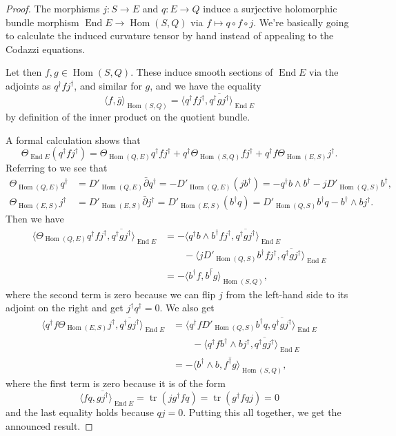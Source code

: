 \documentclass[10pt,a4paper]{article}
\newtheorem*{proof}{Proof}
\def\ov#1{\overline{#1}}
\DeclareMathOperator{\End}{End}
\DeclareMathOperator{\Hom}{Hom}
\DeclareMathOperator{\tr}{tr}
\begin{document}
\begin{proof}
The morphisms $j : S \to E$ and $q : E \to Q$ induce a surjective holomorphic bundle morphism $\End E \to \Hom(S,Q)$ via $f \mapsto q \circ f \circ j$. We're basically going to calculate the induced curvature tensor by hand instead of appealing to the Codazzi equations.

Let then $f,g \in \Hom(S,Q)$. These induce smooth sections of $\End E$ via the adjoints as $q^\dagger f j^\dagger$, and similar for $g$, and we have the equality
\[
\langle f, \ov g \rangle_{\Hom(S,Q)}
= \langle q^\dagger f j^\dagger, \ov{q^\dagger g j^\dagger} \rangle_{\End E}
\]
by definition of the inner product on the quotient bundle.

A formal calculation shows that
\[
\Theta_{\End E} (q^\dagger f j^\dagger)
= \Theta_{\Hom(Q,E)} q^\dagger f j^\dagger
+ q^\dagger \Theta_{\Hom(S,Q)} f j^\dagger
+ q^\dagger f \Theta_{\Hom(E,S)} j^\dagger.
\]
Referring to  we see that
\begin{align*}
\Theta_{\Hom(Q,E)} q^\dagger
&= D'_{\Hom(Q,E)} \bar\partial q^\dagger
= -D'_{\Hom(Q,E)} (j b^\dagger)
= -q^\dagger b \wedge b^\dagger - j D'_{\Hom(Q,S)}b^\dagger,
\\
\Theta_{\Hom(E,S)} j^\dagger
&= D'_{\Hom(E,S)} \bar\partial j^\dagger
= D'_{\Hom(E,S)}(b^\dagger q)
= D'_{\Hom(Q,S)}b^\dagger q - b^\dagger \wedge b j^\dagger.
\end{align*}
Then we have
\begin{align*}
\langle \Theta_{\Hom(Q,E)} q^\dagger f j^\dagger, \ov{q^\dagger g j^\dagger} \rangle_{\End E}
&= -\langle q^\dagger b \wedge b^\dagger f j^\dagger, \ov{q^\dagger g j^\dagger} \rangle_{\End E}
\\
&\qquad - \langle j D'_{\Hom(Q,S)}b^\dagger f j^\dagger, \ov{q^\dagger g j^\dagger} \rangle_{\End E}
\\
&= -\langle b^\dagger f, \ov{b^\dagger g} \rangle_{\Hom(S,Q)},
\end{align*}
where the second term is zero because we can flip $j$ from the left-hand side to its adjoint on the right and get $j^\dagger q^\dagger = 0$. We also get
\begin{align*}
\langle q^\dagger f \Theta_{\Hom(E,S)} j^\dagger, \ov{q^\dagger g j^\dagger} \rangle_{\End E}
&= \langle q^\dagger f D'_{\Hom(Q,S)}b^\dagger q , \ov{q^\dagger g j^\dagger} \rangle_{\End E}
\\
&\qquad
- \langle q^\dagger f b^\dagger \wedge b j^\dagger, \ov{q^\dagger g j^\dagger} \rangle_{\End E}
\\
&= - \langle b^\dagger \wedge b, \ov{f^\dagger g} \rangle_{\Hom(S,Q)},
\end{align*}
where the first term is zero because it is of the form
\[
\langle f q, \ov{g j^\dagger} \rangle_{\End E}
= \tr(j g^\dagger f q)
= \tr(g^\dagger f q j) = 0
\]
and the last equality holds because $q j = 0$.
Putting this all together, we get the announced result.
\end{proof}
\end{document}
